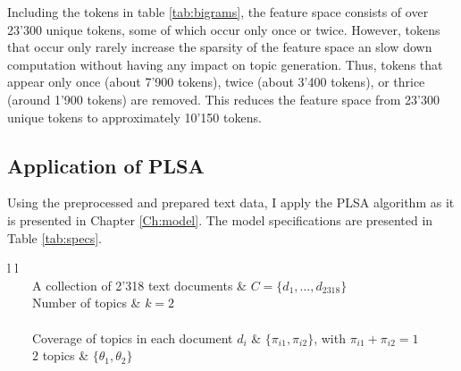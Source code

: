 \documentclass[11pt,a4paper,english,oneside]{book}
\newcommand{\tabitem}{~~\llap{\textbullet}~~}
\numberwithin{equation}{chapter}
\begin{document}
Including the tokens in table \ref{tab:bigrams}, the feature space consists of over 23'300 unique tokens, some of which occur only once or twice. However, tokens that occur only rarely increase the sparsity of the feature space an slow down computation without having any impact on topic generation. Thus, tokens that appear only once (about 7'900 tokens), twice (about 3'400 tokens), or thrice (around 1'900 tokens) are removed. This reduces the feature space from 23'300 unique tokens to approximately 10'150 tokens. 


\subsection{Application of PLSA}

Using the preprocessed and prepared text data, I apply the PLSA algorithm as it is presented in Chapter \ref{Ch:model}. The model specifications are presented in Table \ref{tab:specs}.

\begin{table}[h] %
	\centering %
	\begin{tabular}{ l  l  } %
		\toprule %
		 \\
		\midrule %
		\tabitem A collection of 2'318  text documents & $C=\{d_1,...,d_{2318}\}$ \\
		\tabitem Number of topics & $k = 2$ \\
		\midrule
		 \\
		\midrule
		\tabitem Coverage of topics in each document $d_i$ & $\{\pi_{i1}, \pi_{i2}\}$, with $\pi_{i1}+\pi_{i2}=1$\\
		\tabitem $2$ topics & $\{\theta_1, \theta_2\}$\\ %
		\bottomrule %
	\end{tabular}
	\caption{Specification of PLSA model.} %
	\label{tab:specs} %
\end{table}
\end{document}
